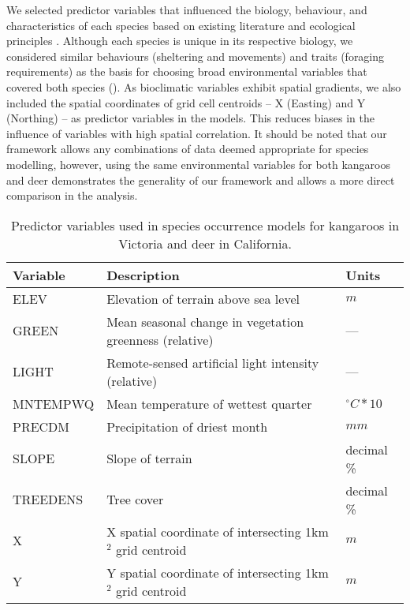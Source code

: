 We selected predictor variables that influenced the biology, behaviour, and characteristics of each species based on existing literature and ecological principles \citep[e.g.][]{coul10,ferg05}. Although each species is unique in its respective biology, we considered similar behaviours (sheltering and movements) and traits (foraging requirements) as the basis for choosing broad environmental variables that covered both species ().  As bioclimatic variables exhibit spatial gradients, we also included the spatial coordinates of grid cell centroids -- X (Easting) and Y (Northing) -- as predictor variables in the models.  This reduces biases in the influence of variables with high spatial correlation.  It should be noted that our framework allows any combinations of data deemed appropriate for species modelling, however, using the same environmental variables for both kangaroos and deer demonstrates the generality of our framework and allows a more direct comparison in the analysis.

\begin{table}[!t]
\caption[Predictor variables used in species occurrence models for kangaroos and deer]{Predictor variables used in species occurrence models for kangaroos in Victoria and deer in California.}
\centering
\begin{tabularx}{0.9\textwidth}{lll} \toprule
Variable 	&Description 												&Units \\ \midrule 
ELEV 		&Elevation of terrain above sea level 						&$m$\\
GREEN 		&Mean seasonal change in vegetation greenness (relative) 	&---\\
LIGHT 		&Remote-sensed artificial light intensity (relative) 		&---\\ 
MNTEMPWQ 	&Mean temperature of wettest quarter 						&$^{\circ}C*10$\\
PRECDM 		&Precipitation of driest month 								&$mm$\\
SLOPE 		&Slope of terrain 											&decimal \%\\ 
TREEDENS 	&Tree cover 												&decimal \%\\ 
X 			&X spatial coordinate of intersecting 1km$^2$ grid centroid &$m$\\
Y 			&Y spatial coordinate of intersecting 1km$^2$ grid centroid &$m$\\
\bottomrule
\end{tabularx}
\label{cal_vic_vars}
\end{table}

